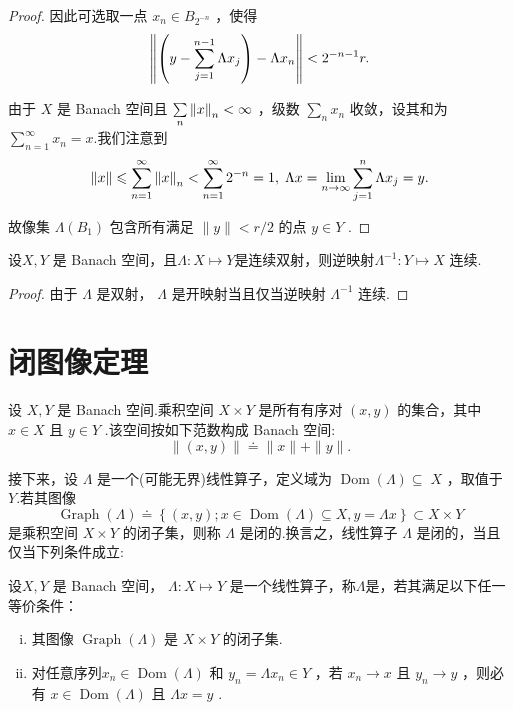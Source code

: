 \begin{proof}
因此可选取一点 ${x}_{n} \in  {B}_{{2}^{-n}}$ ，使得
\[
\norm{\left( {y - \mathop{\sum }\limits_{{j = 1}}^{{n - 1}}\Lambda {x}_{j}}\right)  - \Lambda {x}_{n}} < {2}^{-n - 1}r.
\]

由于 $X$ 是 Banach 空间且 $\mathop{\sum }\limits_{n}\norm{x}_{n} < \infty$ ，级数 $\mathop{\sum }\limits_{n}{x}_{n}$ 收敛，设其和为 $\mathop{\sum }\limits_{{n = 1}}^{\infty }{x}_{n} = x$.我们注意到
\[
\| x\|  \leqslant  \mathop{\sum }\limits_{{n = 1}}^{\infty }\norm{x}_{n} < \mathop{\sum }\limits_{{n = 1}}^{\infty }{2}^{-n} = 1,\;{\Lambda x} = \mathop{\lim }\limits_{{n \rightarrow  \infty }}\mathop{\sum }\limits_{{j = 1}}^{n}\Lambda {x}_{j} = y.
\]

故像集 $\Lambda \left( {B}_{1}\right)$ 包含所有满足 $\| y\|  < r/2$ 的点 $y \in  Y$ .
\end{proof}

\begin{corollary}\label{cor:inverse-continuous}
设$X,Y$ 是 Banach 空间，且$\Lambda  : X \mapsto  Y$是连续双射，则逆映射${\Lambda }^{-1} : Y \mapsto  X$ 连续.
\end{corollary}

\begin{proof}
由于 $\Lambda$ 是双射， $\Lambda$ 是开映射当且仅当逆映射 ${\Lambda }^{-1}$ 连续.
\end{proof}

\section{闭图像定理}

设 $X,Y$ 是 Banach 空间.乘积空间 $X \times  Y$ 是所有有序对 $\left( {x,y}\right)$ 的集合，其中 $x \in  X$ 且 $y \in  Y$ .该空间按如下范数构成 Banach 空间:
\begin{equation}\tag{4.5}\label{eq:product-norm}
\| \left( {x,y}\right) \|  \doteq  \| x\|  + \| y\| .
\end{equation}

接下来，设 $\Lambda$ 是一个(可能无界)线性算子，定义域为 $\operatorname{Dom}\left( \Lambda \right)  \subseteq \; X$ ，取值于 $Y$.若其图像
\[
\operatorname{Graph}\left( \Lambda \right)  \doteq  \left\{  {\left( {x,y}\right) ;x \in  \operatorname{Dom}\left( \Lambda \right)  \subseteq  X,y = {\Lambda x}}\right\}   \subset  X \times  Y
\]
是乘积空间 $X \times  Y$ 的闭子集，则称 $\Lambda$ 是闭的.换言之，线性算子 $\Lambda$ 是闭的，当且仅当下列条件成立:
\begin{definition}[闭算子]
    设$X,Y$ 是 Banach 空间， $\Lambda : X \mapsto  Y$ 是一个线性算子，称$\Lambda$是，若其满足以下任一等价条件：
    \begin{enumerate}[(i)]
        \item 其图像 $\operatorname{Graph}\left( \Lambda \right)$ 是 $X \times  Y$ 的闭子集.
        \item 对任意序列${x}_{n} \in  \operatorname{Dom}\left( \Lambda \right)$ 和 ${y}_{n} = \Lambda {x}_{n} \in  Y$ ，若 ${x}_{n} \rightarrow  x$ 且 ${y}_{n} \rightarrow  y$ ，则必有 $x \in  \operatorname{Dom}\left( \Lambda \right)$ 且 ${\Lambda x} = y$ .
    \end{enumerate}
\end{definition}


